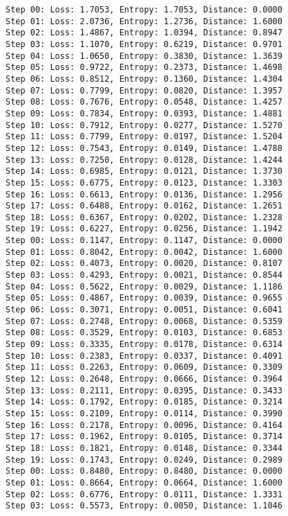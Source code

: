 \documentclass[11pt]{article}
\begin{document}
    \begin{Verbatim}[commandchars=\\\{\}]
Step 00: Loss: 1.7053, Entropy: 1.7053, Distance: 0.0000
Step 01: Loss: 2.0736, Entropy: 1.2736, Distance: 1.6000
Step 02: Loss: 1.4867, Entropy: 1.0394, Distance: 0.8947
Step 03: Loss: 1.1070, Entropy: 0.6219, Distance: 0.9701
Step 04: Loss: 1.0650, Entropy: 0.3830, Distance: 1.3639
Step 05: Loss: 0.9722, Entropy: 0.2373, Distance: 1.4698
Step 06: Loss: 0.8512, Entropy: 0.1360, Distance: 1.4304
Step 07: Loss: 0.7799, Entropy: 0.0820, Distance: 1.3957
Step 08: Loss: 0.7676, Entropy: 0.0548, Distance: 1.4257
Step 09: Loss: 0.7834, Entropy: 0.0393, Distance: 1.4881
Step 10: Loss: 0.7912, Entropy: 0.0277, Distance: 1.5270
Step 11: Loss: 0.7799, Entropy: 0.0197, Distance: 1.5204
Step 12: Loss: 0.7543, Entropy: 0.0149, Distance: 1.4788
Step 13: Loss: 0.7250, Entropy: 0.0128, Distance: 1.4244
Step 14: Loss: 0.6985, Entropy: 0.0121, Distance: 1.3730
Step 15: Loss: 0.6775, Entropy: 0.0123, Distance: 1.3303
Step 16: Loss: 0.6613, Entropy: 0.0136, Distance: 1.2956
Step 17: Loss: 0.6488, Entropy: 0.0162, Distance: 1.2651
Step 18: Loss: 0.6367, Entropy: 0.0202, Distance: 1.2328
Step 19: Loss: 0.6227, Entropy: 0.0256, Distance: 1.1942
Step 00: Loss: 0.1147, Entropy: 0.1147, Distance: 0.0000
Step 01: Loss: 0.8042, Entropy: 0.0042, Distance: 1.6000
Step 02: Loss: 0.4073, Entropy: 0.0020, Distance: 0.8107
Step 03: Loss: 0.4293, Entropy: 0.0021, Distance: 0.8544
Step 04: Loss: 0.5622, Entropy: 0.0029, Distance: 1.1186
Step 05: Loss: 0.4867, Entropy: 0.0039, Distance: 0.9655
Step 06: Loss: 0.3071, Entropy: 0.0051, Distance: 0.6041
Step 07: Loss: 0.2748, Entropy: 0.0068, Distance: 0.5359
Step 08: Loss: 0.3529, Entropy: 0.0103, Distance: 0.6853
Step 09: Loss: 0.3335, Entropy: 0.0178, Distance: 0.6314
Step 10: Loss: 0.2383, Entropy: 0.0337, Distance: 0.4091
Step 11: Loss: 0.2263, Entropy: 0.0609, Distance: 0.3309
Step 12: Loss: 0.2648, Entropy: 0.0666, Distance: 0.3964
Step 13: Loss: 0.2111, Entropy: 0.0395, Distance: 0.3433
Step 14: Loss: 0.1792, Entropy: 0.0185, Distance: 0.3214
Step 15: Loss: 0.2109, Entropy: 0.0114, Distance: 0.3990
Step 16: Loss: 0.2178, Entropy: 0.0096, Distance: 0.4164
Step 17: Loss: 0.1962, Entropy: 0.0105, Distance: 0.3714
Step 18: Loss: 0.1821, Entropy: 0.0148, Distance: 0.3344
Step 19: Loss: 0.1743, Entropy: 0.0249, Distance: 0.2989
Step 00: Loss: 0.8480, Entropy: 0.8480, Distance: 0.0000
Step 01: Loss: 0.8664, Entropy: 0.0664, Distance: 1.6000
Step 02: Loss: 0.6776, Entropy: 0.0111, Distance: 1.3331
Step 03: Loss: 0.5573, Entropy: 0.0050, Distance: 1.1046

\end{Verbatim}
\end{document}
